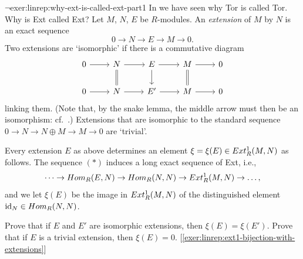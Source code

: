 \begin{exer}{$\lnot$}{exer:linrep:why-ext-is-called-ext-part1}
  In  we have seen why Tor is
  called Tor. Why is Ext called Ext? Let $M$, $N$, $E$ be
  $R$-modules. An \emph{extension} of $M$ by $N$ is an exact sequence
  \[
    \tag{$*$} 0 \to N \to E \to M \to 0.
  \]
  Two extensions are `isomorphic' if there is a commutative diagram
  \[
    \begin{tikzcd}
      0 \ar[r] & N \ar[r] \ar[d, equal] & E \ar[r] \ar[d] &
      M \ar[r] \ar[d, equal] & 0 \\
      0 \ar[r] & N \ar[r] & E' \ar[r] & M \ar[r] & 0
    \end{tikzcd}
  \]
  linking them. (Note that, by the snake lemma, the middle arrow must
  then be an isomorphism: cf.\
  .) Extensions that
  are isomorphic to the standard sequence
  $0 \to N \to N \oplus M \to M \to 0$ are `trivial'.

  Every extension $E$ as above determines an element
  $\xi = \xi(E) \in Ext^1_R(M, N)$ as follows. The sequence $(*)$
  induces a long exact sequence of Ext, i.e.,
  \[
    \dots \to Hom_R(E, N) \to Hom_R(N, N) \to Ext^1_R(M, N) \to
    \dots,
  \]
  and we let $\xi(E)$ be the image in $Ext^1_R(M, N)$ of the
  distinguished element $\operatorname{id}_N \in Hom_R(N, N)$.

  Prove that if $E$ and $E'$ are isomorphic extensions, then
  $\xi(E) = \xi(E')$. Prove that if $E$ is a trivial extension, then
  $\xi(E) = 0$. [\ref{exer:linrep:ext1-bijection-with-extensions}]
\end{exer}

